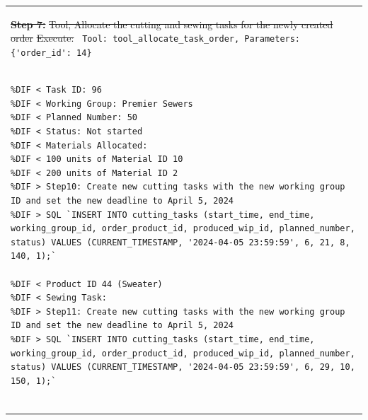 \documentclass[preprint,12pt]{elsarticle}
\providecommand{\DIFdeltex}[1]{{\protect\color{red}\sout{#1}}}                      %
\providecommand{\DIFaddbegin}{} %
\providecommand{\DIFdelend}{} %
\providecommand{\DIFmodbegin}{} %
\providecommand{\DIFdel}[1]{\texorpdfstring{\DIFdeltex{#1}}{}} %
\newcommand{\DIFaddincludegraphics}[2][]{{\color{blue}\fbox{\DIFOincludegraphics[#1]{#2}}}} %
\DeclareRobustCommand{\DIFaddbegin}{\DIFOaddbegin \let\includegraphics\DIFaddincludegraphics} %
\DeclareRobustCommand{\DIFdelend}{\DIFOaddend \let\includegraphics\DIFOincludegraphics} %
\begin{document}
\begin{center}
\begin{longtable}{p{390pt}}
\textbf{\DIFdel{Step 7:}} %
\DIFdel{Tool, Allocate the cutting and sewing tasks for the newly created order}%
\DIFdel{Execute:}%
%
{\color{red}%
\lstinline! Tool: tool_allocate_task_order, Parameters: {'order_id': 14}!%
}%
\DIFdelend \DIFaddbegin \DIFmodbegin
\begin{lstlisting}[style=my_operation, label={lst:chain_of_operation},alsolanguage=DIFcode]

%DIF < Task ID: 96
%DIF < Working Group: Premier Sewers
%DIF < Planned Number: 50
%DIF < Status: Not started
%DIF < Materials Allocated:
%DIF < 100 units of Material ID 10
%DIF < 200 units of Material ID 2
%DIF > Step10: Create new cutting tasks with the new working group ID and set the new deadline to April 5, 2024
%DIF > SQL `INSERT INTO cutting_tasks (start_time, end_time, working_group_id, order_product_id, produced_wip_id, planned_number, status) VALUES (CURRENT_TIMESTAMP, '2024-04-05 23:59:59', 6, 21, 8, 140, 1);`

%DIF < Product ID 44 (Sweater)
%DIF < Sewing Task:
%DIF > Step11: Create new cutting tasks with the new working group ID and set the new deadline to April 5, 2024
%DIF > SQL `INSERT INTO cutting_tasks (start_time, end_time, working_group_id, order_product_id, produced_wip_id, planned_number, status) VALUES (CURRENT_TIMESTAMP, '2024-04-05 23:59:59', 6, 29, 10, 150, 1);`


\end{lstlisting}
\end{longtable}
\end{center}
\end{document}
